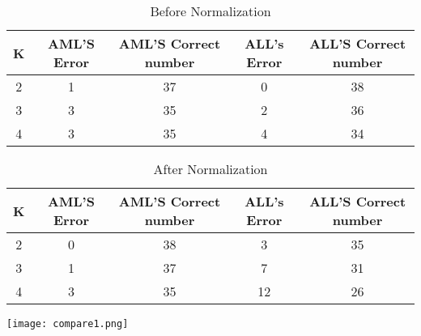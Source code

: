 \documentclass[a4pper,11pt,onecolumn]{article}
\begin{document}
\begin{table}[h]  %
	\centering  %
	\caption{Before Normalization}  %
	\begin{tabular}{ccccc}  %
		\hline
		\hline
		K& AML'S Error & AML'S Correct number& ALL's Error & ALL'S Correct number \\ [0.5ex] 
		\hline
		2& 1 &37& 0&  38  \\
		3& 3 &35& 2 & 36\\
		4& 3 & 35&4  &34\\
		\hline
		\hline
	\end{tabular}
\end{table}

\begin{table}[h]  %
	\centering  %
	\caption{After Normalization}  %
	\begin{tabular}{ccccc}  %
		\hline
		\hline
		K& AML'S Error & AML'S Correct number& ALL's Error & ALL'S Correct number \\ [0.5ex] 
		\hline
		2& 0 &38& 3&  35  \\
		3& 1 &37& 7 & 31\\
		4& 3 & 35&12  &26\\
		\hline
		\hline
	\end{tabular}
\end{table}


\texttt{[image: compare1.png]}
\end{document}

